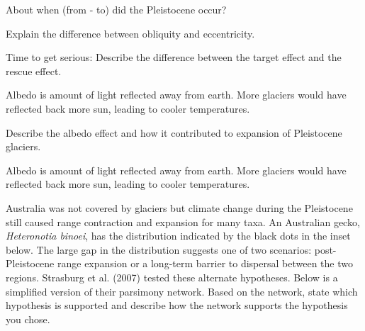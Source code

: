 \documentclass[11pt]{exam}
\begin{document}
\begin{questions}

\question[3]
About when (from - to) did the Pleistocene occur?

\question[5]
Explain the difference between obliquity and eccentricity.


\question[10]
Time to get serious: Describe the difference between the target effect and the rescue effect.

	\begin{solution}
	Albedo is amount of light reflected away from earth. More glaciers would have reflected back more sun, leading to cooler temperatures.
	\end{solution}

\vspace{3in}


\question[10]
Describe the albedo effect and how it contributed to expansion of Pleistocene glaciers.

	\begin{solution}
	Albedo is amount of light reflected away from earth. More glaciers would have reflected back more sun, leading to cooler temperatures.
	\end{solution}





\newpage

\question[15]
Australia was not covered by glaciers but climate change during the Pleistocene still caused range contraction and expansion for many taxa.  An Australian gecko, \textit{Heteronotia binoei}, has the distribution indicated by the black dots in the inset below.  The large gap in the distribution suggests one of two scenarios: post-Pleistocene range expansion or a long-term barrier to dispersal between the two regions. Strasburg et al. (2007) tested these alternate hypotheses. Below is a simplified version of their parsimony network.  Based on the network, state which hypothesis is supported and describe how the network supports the hypothesis you chose. 


\end{questions}
\end{document}
